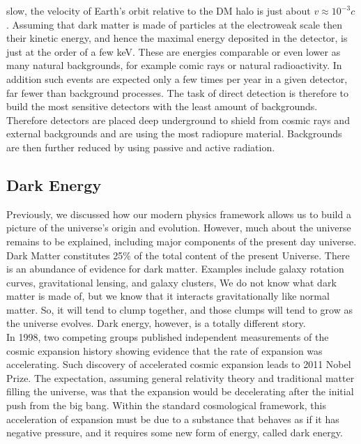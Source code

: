 \documentclass[11pt]{article}
\theoremstyle{break}
\theoremstyle{break}
\begin{document}
\begin{enumerate}
slow, the velocity of Earth's orbit relative to the DM halo is just about $v \approx 10^{-3}c$. Assuming
that dark matter is made of particles at the electroweak scale then their kinetic energy, and
hence the maximal energy deposited in the detector, is just at the order of a few keV. These
are energies comparable or even lower as many natural backgrounds, for example comic rays or
natural radioactivity. In addition such events are expected only a few times per year in a given
detector, far fewer than background processes. The task of direct detection is therefore to build
the most sensitive detectors with the least amount of backgrounds. Therefore detectors are placed
deep underground to shield from cosmic rays and external backgrounds and are using the most radiopure material. Backgrounds are then further reduced by using passive and active radiation.
\end{enumerate}

\subsection{Dark Energy}
Previously, we discussed how our modern physics framework allows us to build a picture of the universe's origin and evolution. However, much about the universe remains to be explained, including major components of the present day universe. Dark Matter constitutes 25$\%$ of the total content of the present Universe. There is an abundance of evidence for dark matter. Examples include galaxy rotation curves, gravitational lensing, and galaxy clusters, We do not know what dark matter is made of, but we know that it interacts gravitationally like normal matter. So, it will tend to clump together, and those clumps will tend to grow as the universe evolves. Dark energy, however, is a totally different story. \\

In 1998, two competing groups published independent measurements of the cosmic expansion history showing evidence that the rate of expansion was accelerating. Such discovery of accelerated cosmic expansion leads to 2011 Nobel Prize. The expectation, assuming general relativity theory and traditional matter filling the universe, was that the expansion would be decelerating after the initial push from the big
bang. Within the standard cosmological framework, this acceleration of expansion must be due to a substance that behaves as if it has negative pressure, and it requires some new form of energy, called dark energy. \\
\end{document}
